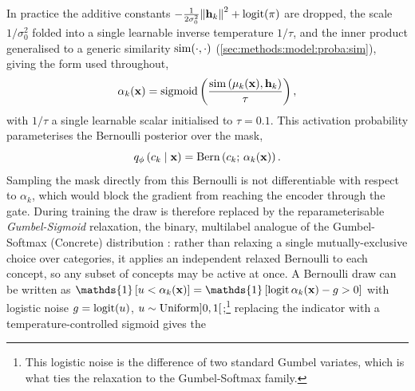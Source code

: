 In practice the additive constants
$-\frac{1}{2\sigma_0^2}\norm{\vb{h}_k}^2 + \operatorname{logit}(\pi)$ are dropped, the
scale $1/\sigma_0^2$ folded into a single learnable inverse temperature
$1/\tau$, and the inner product generalised to a generic similarity
$\operatorname{sim}(\cdot, \cdot)$ (\cref{sec:methods:model:proba:sim}), giving the form
used throughout,
\begin{equation} \label{eq:methods:proba:alpha}
    \alpha_k(\vb{x}) = \operatorname{sigmoid}\left(
    \frac{\operatorname{sim}\left(\vb{\mu}_k(\vb{x}), \vb{h}_k\right)}{\tau}
    \right),
\end{equation}
with $1/\tau$ a single learnable scalar initialised to $\tau = 0.1$.
This activation probability parameterises the Bernoulli posterior over the mask,
\begin{equation} \label{eq:methods:proba:c_k}
    q_\phi\left(c_k \mid \vb{x}\right) = \operatorname{Bern}\left(c_k; \,
    \alpha_k(\vb{x})\right).
\end{equation}
Sampling the mask directly from this Bernoulli is not differentiable with
respect to $\alpha_k$, which would block the gradient from
reaching the encoder through the gate. During training the draw is therefore
replaced by the reparameterisable \textit{Gumbel-Sigmoid} relaxation, the
binary, multilabel analogue of the Gumbel-Softmax (Concrete) distribution
\citep{jangCategoricalReparameterizationGumbelSoftmax2017,
maddisonConcreteDistributionContinuous2017}: rather than relaxing a single
mutually-exclusive choice over categories, it applies an independent relaxed
Bernoulli to each concept, so any subset of concepts may be active at once. A
Bernoulli draw can be written as
$\mathds{1}\left[u < \alpha_{k}(\vb{x})\right] = \mathds{1}\left[\on{logit}\alpha_k(\vb{x}) - g > 0\right]$
with logistic noise $g = \operatorname{logit}(u)$, $u \sim
\on{Uniform}\ointerval{0}{1}$;\footnote{This logistic noise is the difference of two standard Gumbel
variates, which is what ties the relaxation to the Gumbel-Softmax family.}
replacing the indicator with a temperature-controlled sigmoid gives the
